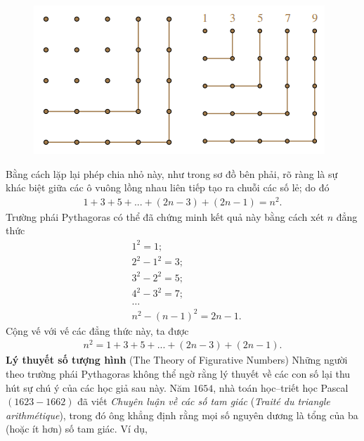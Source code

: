 \begin{multicols}{2}
\begin{figure}[H]
		\vspace*{-5pt}
		\centering
		\captionsetup{labelformat= empty, justification=centering}
		\includegraphics[width=0.85\linewidth]{9a}
		\vspace*{-15pt}
	\end{figure}
	Bằng cách lặp lại phép chia nhỏ này, như trong sơ đồ bên phải, rõ ràng là sự khác biệt giữa các ô vuông lồng nhau liên tiếp tạo ra chuỗi các số lẻ; do đó
	\begin{align*}
		1 + 3 + 5 + ... + \left( {2n - 3} \right) + \left( {2n - 1} \right) = {n^2}.
	\end{align*}
	Trường phái Pythagoras có thể đã chứng minh kết quả này bằng cách xét $n$ đẳng thức
	\begin{align*}
		&1^2 = 1;\\[-0.5ex]
		&2^2 - 1^2 = 3;\\[-0.5ex]
		&{3^2} - {2^2} = 5;\\[-0.5ex]
		&{4^2} - {3^2} = 7;\\[-0.5ex]
		&\ldots\\[-0.5ex]
		&{n^2} - {\left( {n - 1} \right)^2} = 2n - 1.
	\end{align*}
	Cộng vế với vế các đẳng thức này, ta được
	\begin{align*}
		{n^2} = 1 + 3 + 5 + ... + \left( {2n - 3} \right) + \left( {2n - 1} \right).
	\end{align*}
	\textbf{\color{lichsutoanhoc}Lý thuyết số tượng hình} (The Theory of Figurative Numbers)
	\vskip 0.1cm
	Những người theo trường phái Pythagoras không thể ngờ rằng lý thuyết về các con số lại thu hút sự chú ý của các học giả sau này. Năm $1654$, nhà toán học--triết học Pascal $(1623-1662)$ đã viết \textit{Chuyên luận về các số tam giác} (\textit{Traité du triangle arithmétique}), trong đó ông khẳng định rằng mọi số nguyên dương là tổng của ba (hoặc ít hơn) số tam giác. Ví dụ,
	\begin{align*}

\end{align*}
\end{multicols}
